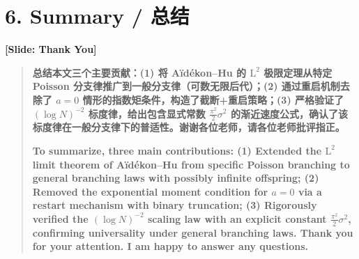\documentclass[12pt,a4paper]{article}
\begin{document}
\section*{6. Summary / 总结}

\begin{center}
\color{blue!60!black}\textbf{[Slide: Thank You]}
\end{center}

\begin{quote}
\textbf{总结本文三个主要贡献：(1) 将 A\"id\'ekon--Hu 的 $\mathrm{L}^2$ 极限定理从特定 Poisson 分支律推广到一般分支律（可数无限后代）；(2) 通过重启机制去除了 $a=0$ 情形的指数矩条件，构造了截断+重启策略；(3) 严格验证了 $(\log N)^{-2}$ 标度律，给出包含显式常数 $\frac{\pi^2}{2}\sigma^2$ 的渐近速度公式，确认了该标度律在一般分支律下的普适性。谢谢各位老师，请各位老师批评指正。}

\bigskip

\textbf{To summarize, three main contributions: (1) Extended the $\mathrm{L}^2$ limit theorem of A\"id\'ekon--Hu from specific Poisson branching to general branching laws with possibly infinite offspring; (2) Removed the exponential moment condition for $a=0$ via a restart mechanism with binary truncation; (3) Rigorously verified the $(\log N)^{-2}$ scaling law with an explicit constant $\frac{\pi^2}{2}\sigma^2$, confirming universality under general branching laws. Thank you for your attention. I am happy to answer any questions.}
\end{quote}
\end{document}
